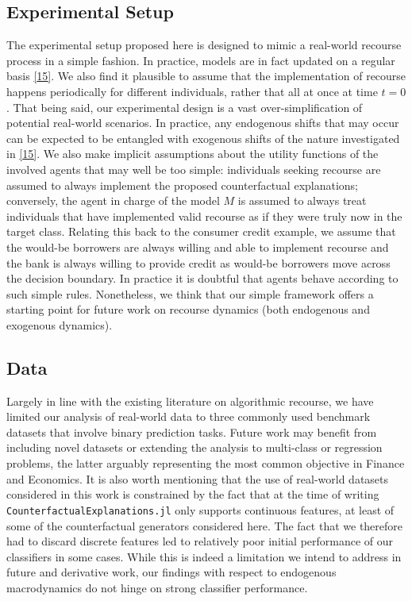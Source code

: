 \documentclass[
  conference]{IEEEtran}
\begin{document}
\hypertarget{experimental-setup}{%
\subsection{Experimental Setup}\label{experimental-setup}}

The experimental setup proposed here is designed to mimic a real-world
recourse process in a simple fashion. In practice, models are in fact
updated on a regular basis
\protect\hyperlink{ref-upadhyay2021towards}{{[}15{]}}. We also find it
plausible to assume that the implementation of recourse happens
periodically for different individuals, rather that all at once at time
\(t=0\). That being said, our experimental design is a vast
over-simplification of potential real-world scenarios. In practice, any
endogenous shifts that may occur can be expected to be entangled with
exogenous shifts of the nature investigated in
\protect\hyperlink{ref-upadhyay2021towards}{{[}15{]}}. We also make
implicit assumptions about the utility functions of the involved agents
that may well be too simple: individuals seeking recourse are assumed to
always implement the proposed counterfactual explanations; conversely,
the agent in charge of the model \(M\) is assumed to always treat
individuals that have implemented valid recourse as if they were truly
now in the target class. Relating this back to the consumer credit
example, we assume that the would-be borrowers are always willing and
able to implement recourse and the bank is always willing to provide
credit as would-be borrowers move across the decision boundary. In
practice it is doubtful that agents behave according to such simple
rules. Nonetheless, we think that our simple framework offers a starting
point for future work on recourse dynamics (both endogenous and
exogenous dynamics).

\hypertarget{data}{%
\subsection{Data}\label{data}}

Largely in line with the existing literature on algorithmic recourse, we
have limited our analysis of real-world data to three commonly used
benchmark datasets that involve binary prediction tasks. Future work may
benefit from including novel datasets or extending the analysis to
multi-class or regression problems, the latter arguably representing the
most common objective in Finance and Economics. It is also worth
mentioning that the use of real-world datasets considered in this work
is constrained by the fact that at the time of writing
\texttt{CounterfactualExplanations.jl} only supports continuous
features, at least of some of the counterfactual generators considered
here. The fact that we therefore had to discard discrete features led to
relatively poor initial performance of our classifiers in some cases.
While this is indeed a limitation we intend to address in future and
derivative work, our findings with respect to endogenous macrodynamics
do not hinge on strong classifier performance.
\end{document}
